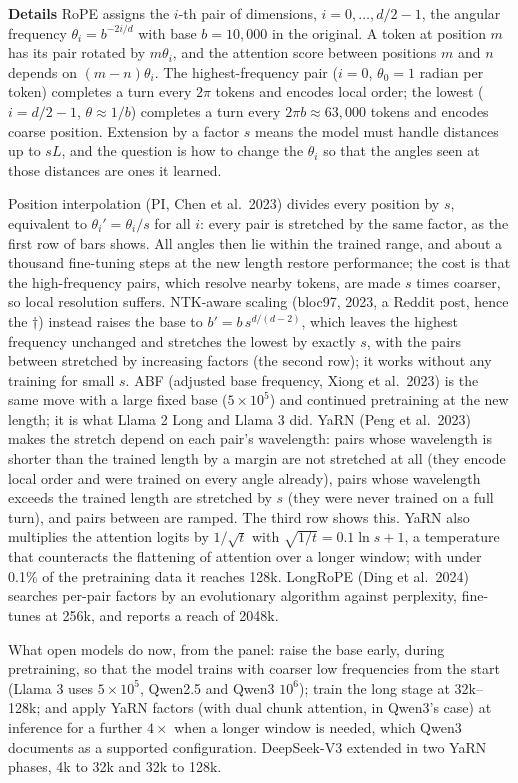 \documentclass[11pt,letterpaper]{article}
\newcommand{\para}[1]{\medskip\noindent\textbf{#1}\quad}
\begin{document}
\para{Details} RoPE assigns the $i$-th pair of dimensions, $i=0,\ldots,d/2-1$, the angular frequency $\theta_i=b^{-2i/d}$ with base $b=10{,}000$ in the original. A token at position $m$ has its pair rotated by $m\theta_i$, and the attention score between positions $m$ and $n$ depends on $(m-n)\theta_i$. The highest-frequency pair ($i=0$, $\theta_0=1$ radian per token) completes a turn every $2\pi$ tokens and encodes local order; the lowest ($i=d/2-1$, $\theta\approx1/b$) completes a turn every $2\pi b\approx63{,}000$ tokens and encodes coarse position. Extension by a factor $s$ means the model must handle distances up to $sL$, and the question is how to change the $\theta_i$ so that the angles seen at those distances are ones it learned.

Position interpolation (PI, Chen et al.\ 2023) divides every position by $s$, equivalent to $\theta_i'=\theta_i/s$ for all $i$: every pair is stretched by the same factor, as the first row of bars shows. All angles then lie within the trained range, and about a thousand fine-tuning steps at the new length restore performance; the cost is that the high-frequency pairs, which resolve nearby tokens, are made $s$ times coarser, so local resolution suffers. NTK-aware scaling (bloc97, 2023, a Reddit post, hence the $\dagger$) instead raises the base to $b'=b\,s^{d/(d-2)}$, which leaves the highest frequency unchanged and stretches the lowest by exactly $s$, with the pairs between stretched by increasing factors (the second row); it works without any training for small $s$. ABF (adjusted base frequency, Xiong et al.\ 2023) is the same move with a large fixed base ($5\times10^5$) and continued pretraining at the new length; it is what Llama 2 Long and Llama 3 did. YaRN (Peng et al.\ 2023) makes the stretch depend on each pair's wavelength: pairs whose wavelength is shorter than the trained length by a margin are not stretched at all (they encode local order and were trained on every angle already), pairs whose wavelength exceeds the trained length are stretched by $s$ (they were never trained on a full turn), and pairs between are ramped. The third row shows this. YaRN also multiplies the attention logits by $1/\sqrt{t}$ with $\sqrt{1/t}=0.1\ln s+1$, a temperature that counteracts the flattening of attention over a longer window; with under 0.1\% of the pretraining data it reaches 128k. LongRoPE (Ding et al.\ 2024) searches per-pair factors by an evolutionary algorithm against perplexity, fine-tunes at 256k, and reports a reach of 2048k.

What open models do now, from the panel: raise the base early, during pretraining, so that the model trains with coarser low frequencies from the start (Llama 3 uses $5\times10^5$, Qwen2.5 and Qwen3 $10^6$); train the long stage at 32k--128k; and apply YaRN factors (with dual chunk attention, in Qwen3's case) at inference for a further $4\times$ when a longer window is needed, which Qwen3 documents as a supported configuration. DeepSeek-V3 extended in two YaRN phases, 4k to 32k and 32k to 128k.
\end{document}
